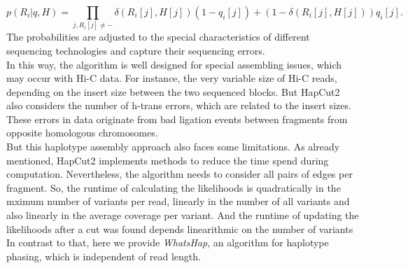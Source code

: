 \begin{equation}
p(R_{i}|q,H) = \prod_{j,R_{i}[j]\neq-} \delta(R_{i}[j],H[j])(1 - q_{i}[j])+(1 - \delta(R_{i}[j],H[j]))q_{i}[j].
\end{equation}
The probabilities are adjusted to the special characteristics of different sequencing technologies and capture their sequencing errors. \cite{HapCut2}\\
In this way, the algorithm is well designed for special assembling issues, which may occur with Hi-C data. For instance, the very variable size of Hi-C reads, depending on the insert size between the two sequenced blocks. But HapCut2 also considers the number of h-trans errors, which are related to the insert sizes. These errors in data originate from bad ligation events between fragments from opposite homologous chromosomes. \cite{HapCut2}\\
But this haplotype assembly approach also faces some limitations. As already mentioned, HapCut2 implements methods to reduce the time spend during computation. Nevertheless, the algorithm needs to consider all pairs of edges per fragment. So, the runtime of calculating the likelihoods is quadratically in the mximum number of variants per read, linearly in the number of all variants and also linearly in the average coverage per variant. And the runtime of updating the likelihoods after a cut was found depends linearithmic on the number of variants \cite{HapCut2}\\
In contrast to that, here we provide \textit{WhatsHap}, an algorithm for haplotype phasing, which is independent of read length. \cite{WhatsHap}

